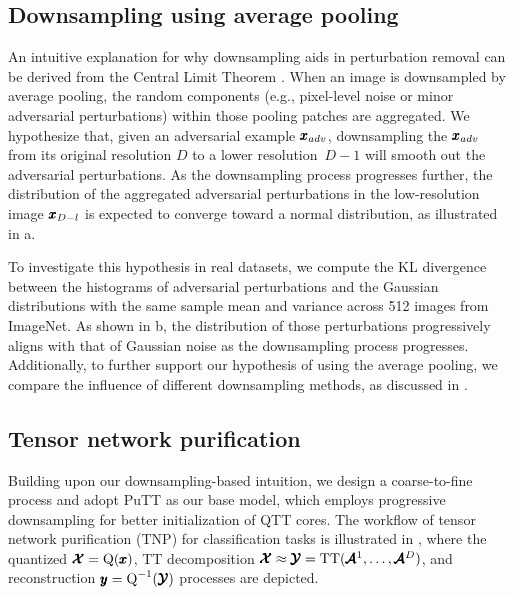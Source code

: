 \subsection{Downsampling using average pooling}

An intuitive explanation for why downsampling aids in perturbation removal can be derived from the Central Limit Theorem \citep[CLT,][]{grzenda2008conditional}. When an image is downsampled by average pooling, the random components (e.g., pixel-level noise or minor adversarial perturbations) within those pooling patches are aggregated.
We hypothesize that, given an adversarial example $\pmb{x}_{adv}$,  downsampling the $\pmb{x}_{adv}$ from its original resolution $D$ to a lower resolution~$D-1$ will smooth out the adversarial perturbations. 
As the downsampling process progresses further, the distribution of the aggregated adversarial perturbations in the low-resolution image $\pmb{x}_{D-l}$ is expected to converge toward a normal distribution, as illustrated in a.

To investigate this hypothesis in real datasets, we compute the KL divergence between the histograms of adversarial perturbations and the Gaussian distributions with the same sample mean and variance across 512 images from ImageNet. As shown in b, the distribution of those perturbations progressively aligns with that of Gaussian noise as the downsampling process progresses. Additionally, to further support our hypothesis of using the average pooling, we compare the influence of different downsampling methods, as discussed in .



\subsection{Tensor network purification}

Building upon our downsampling-based intuition, we
design a coarse-to-fine process
and adopt PuTT \citep{loeschcke2024coarse} as our base model, which
employs progressive
downsampling for better initialization of QTT cores.
The workflow of tensor network purification (TNP) for classification tasks is illustrated in , where the quantized $\pmb{\mathcal{X}} = \operatorname{Q}(\pmb{x})$, TT decomposition $\pmb{\mathcal{X}} \approx \pmb{\mathcal{Y}}=\text{TT}(\pmb{\mathcal{A}}^1, \ldots, \pmb{\mathcal{A}}^D)$, and reconstruction $\pmb{y} = \operatorname{Q}^{-1}(\pmb{\mathcal{Y}})$ processes are depicted.

